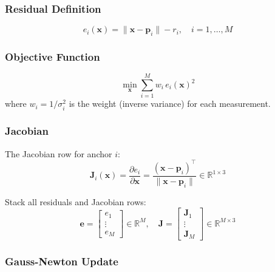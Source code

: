 \documentclass[11pt,a4paper]{article}
\begin{document}
\subsubsection{Residual Definition}

\begin{equation}
    e_i(\mathbf{x}) = \|\mathbf{x} - \mathbf{p}_i\| - r_i, \quad i = 1, \dots, M
\end{equation}

\subsubsection{Objective Function}

\begin{mathbox}
\begin{equation}
    \boxed{\min_{\mathbf{x}} \sum_{i=1}^{M} w_i \, e_i(\mathbf{x})^2}
\end{equation}
where $w_i = 1/\sigma_i^2$ is the weight (inverse variance) for each measurement.
\end{mathbox}

\subsubsection{Jacobian}

The Jacobian row for anchor $i$:
\begin{equation}
    \mathbf{J}_i(\mathbf{x}) = \frac{\partial e_i}{\partial \mathbf{x}} = \frac{(\mathbf{x} - \mathbf{p}_i)^\top}{\|\mathbf{x} - \mathbf{p}_i\|} \in \mathbb{R}^{1 \times 3}
\end{equation}

Stack all residuals and Jacobian rows:
\begin{equation}
    \mathbf{e} = \begin{bmatrix} e_1 \\ \vdots \\ e_M \end{bmatrix} \in \mathbb{R}^M, \quad
    \mathbf{J} = \begin{bmatrix} \mathbf{J}_1 \\ \vdots \\ \mathbf{J}_M \end{bmatrix} \in \mathbb{R}^{M \times 3}
\end{equation}

\subsubsection{Gauss-Newton Update}
\end{document}
